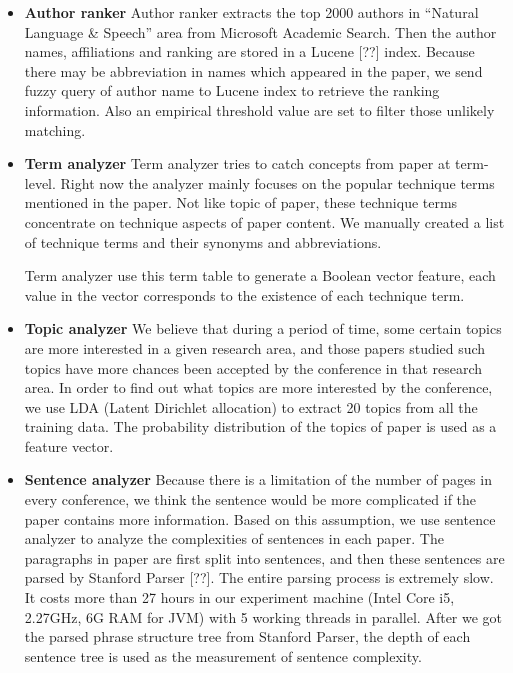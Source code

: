 \documentclass[11pt,letterpaper]{article}
\begin{document}
\begin{itemize} 
\item {\bf Author ranker}
Author ranker extracts the top 2000 authors in “Natural Language \& Speech” area from Microsoft Academic Search. Then the author names, affiliations and ranking are stored in a Lucene [??] index. Because there may be abbreviation in names which appeared in the paper, we send fuzzy query of author name to Lucene index to retrieve the ranking information. Also an empirical threshold value are set to filter those unlikely matching. 


\item {\bf Term analyzer}
Term analyzer tries to catch concepts from paper at term-level. Right now the analyzer mainly focuses on the popular technique terms mentioned in the paper. Not like topic of paper, these technique terms concentrate on technique aspects of paper content. We manually created a list of technique terms and their synonyms and abbreviations. 

Term analyzer use this term table to generate a Boolean vector feature, each value in the vector corresponds to the existence of each technique term. 


\item	{\bf Topic analyzer}
We believe that during a period of time, some certain topics are more interested in a given research area, and those papers studied such topics have more chances been accepted by the conference in that research area. In order to find out what topics are more interested by the conference, we use LDA (Latent Dirichlet allocation) to extract 20 topics from all the training data. The probability distribution of the topics of paper is used as a feature vector.  

\item	{\bf Sentence analyzer}
Because there is a limitation of the number of pages in every conference, we think the sentence would be more complicated if the paper contains more information. Based on this assumption, we use sentence analyzer to analyze the complexities of sentences in each paper. The paragraphs in paper are first split into sentences, and then these sentences are parsed by Stanford Parser [??]. The entire parsing process is extremely slow. It costs more than 27 hours in our experiment machine (Intel Core i5, 2.27GHz, 6G RAM for JVM) with 5 working threads in parallel. After we got the parsed phrase structure tree from Stanford Parser, the depth of each sentence tree is used as the measurement of sentence complexity. 

\end{itemize} 
\end{document}
